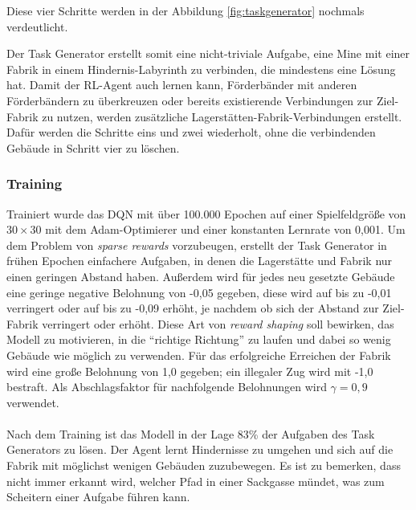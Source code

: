 Diese vier Schritte werden in der Abbildung \ref{fig:taskgenerator} nochmals verdeutlicht.

Der Task Generator erstellt somit eine nicht-triviale Aufgabe, eine Mine mit einer Fabrik in einem Hindernis-Labyrinth zu verbinden, die mindestens eine Lösung hat.
Damit der RL-Agent auch lernen kann, Förderbänder mit anderen Förderbändern zu überkreuzen oder bereits existierende Verbindungen zur Ziel-Fabrik zu nutzen, werden zusätzliche Lagerstätten-Fabrik-Verbindungen erstellt. Dafür werden die Schritte eins und zwei wiederholt, ohne die verbindenden Gebäude in Schritt vier zu löschen.

\subsubsection*{Training}
Trainiert wurde das DQN  mit über 100.000 Epochen auf einer Spielfeldgröße von $30\times30$ mit dem Adam-Optimierer und einer konstanten Lernrate von 0,001. Um dem Problem von \textit{sparse rewards} vorzubeugen, erstellt der Task Generator in frühen Epochen einfachere Aufgaben, in denen die Lagerstätte und Fabrik nur einen geringen Abstand haben. Außerdem wird für jedes neu gesetzte Gebäude eine geringe negative Belohnung von -0,05 gegeben, diese wird auf bis zu -0,01 verringert oder auf bis zu -0,09 erhöht, je nachdem ob sich der Abstand zur Ziel-Fabrik verringert oder erhöht. Diese Art von \textit{reward shaping} soll bewirken, das Modell zu motivieren, in die “richtige Richtung” zu laufen und dabei so wenig Gebäude wie möglich zu verwenden. Für das erfolgreiche Erreichen der Fabrik wird eine große Belohnung von 1,0 gegeben; ein illegaler Zug wird mit -1,0 bestraft. Als Abschlagsfaktor für nachfolgende Belohnungen wird $\gamma=0,9$ verwendet.
\\\\
Nach dem Training ist das Modell in der Lage 83\% der Aufgaben des Task Generators zu lösen. Der Agent lernt Hindernisse zu umgehen und sich auf die Fabrik mit möglichst wenigen Gebäuden zuzubewegen. Es ist zu bemerken, dass nicht immer erkannt wird, welcher Pfad in einer Sackgasse mündet, was zum Scheitern einer Aufgabe führen kann.

